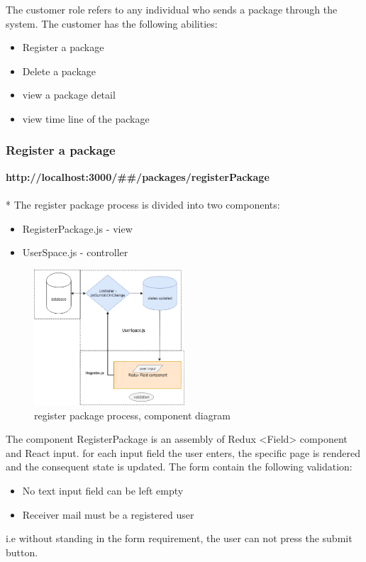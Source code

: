 The customer role refers to any individual who sends a package through the system.
The customer has the following abilities:

\begin{itemize}
    \item Register a package
    \item Delete a package
    \item view a package detail  
    \item view time line of the package
\end{itemize}


\subsubsection{Register a package}
\textbf{http://localhost:3000/##/packages/registerPackage}\\
\\*
The register package process is divided into two components:
\begin{itemize}
\item RegisterPackage.js - view 
\item UserSpace.js - controller 
\end{itemize}


\begin{figure}[!ht]
	\centering
	\includegraphics[width=0.5\textwidth]{images/register.jpg}
	\caption{register package process, component diagram}
	\label{fig:}
\end{figure}


The component RegisterPackage is an assembly of Redux <Field> component and React input.
for each input field the user enters, the specific page is rendered and the consequent state is updated.
The form contain the following validation:
\begin{itemize}
\item No text input field can be left empty 
\item Receiver mail must be a registered user
\end{itemize}
i.e without standing in the form requirement, the user can not press the submit button.

